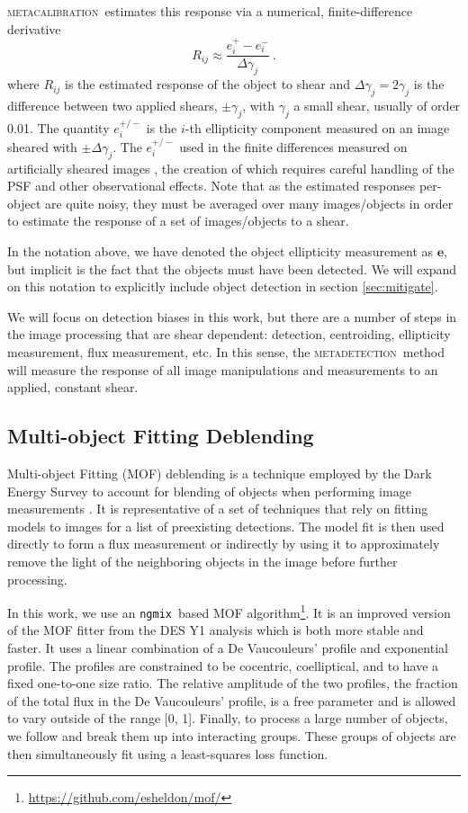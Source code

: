 \documentclass[fleqn,useAMS,usenatbib]{mnras}
\newcommand{\ngmix}{\texttt{ngmix}}
\newcommand{\mcal}{\textsc{metacalibration}}
\newcommand{\mdet}{\textsc{metadetection}}
\begin{document}
\mcal\ estimates this response via a numerical, finite-difference derivative
\begin{displaymath}
R_{ij} \approx \frac{e_i^{+} - e_i^{-}}{\Delta\gamma_j}\ .
\end{displaymath}
where $R_{ij}$ is the estimated response of the object to shear and
$\Delta\gamma_j = 2 \gamma_j$ is the difference between two applied shears,
$\pm \gamma_j$, with $\gamma_j$ a small shear, usually of order 0.01. The
quantity $e_i^{+/-}$ is the $i$-th ellipticity component measured on an image
sheared with $\pm\Delta\gamma_j$.  The $e_i^{+/-}$ used in the finite
differences measured on artificially sheared images \citep{SheldonMcal2017},
the creation of which requires careful handling of the PSF and other
observational effects.  Note that as the estimated responses per-object are
quite noisy, they must be averaged over many images/objects in order to
estimate the response of a set of images/objects to a shear.

In the notation above, we have denoted the object ellipticity measurement as
$\boldsymbol{e}$, but implicit is the fact that the objects must have been
detected.  We will expand on this notation to explicitly include object
detection in section \ref{sec:mitigate}.

We will focus on detection biases in this work, but there are a number of steps
in the image processing that are shear dependent: detection, centroiding,
ellipticity measurement, flux measurement, etc.  In this sense, the \mdet\
method will measure the response of all image manipulations and measurements to
an applied, constant shear.

\subsection{Multi-object Fitting Deblending}

Multi-object Fitting (MOF) deblending is a technique employed by the Dark
Energy Survey to account for blending of objects when performing image
measurements \citep{DESY1cat}. It is representative of a set of techniques that
rely on fitting models to images for a list of preexisting detections. The
model fit is then used directly to form a flux measurement or indirectly by
using it to approximately remove the light of the neighboring objects in the
image before further processing.

In this work, we use an \ngmix\ based MOF
algorithm\footnote{\url{https://github.com/esheldon/mof/}}. It is an improved
version of the MOF fitter from the DES Y1 analysis which is both more stable
and faster. It uses a linear combination of a De Vaucouleurs'
\citep{devauc1948} profile and exponential profile. The profiles are
constrained to be cocentric, coelliptical, and to have a fixed one-to-one size
ratio.  The relative amplitude of the two profiles, the fraction of the total
flux in the De Vaucouleurs' profile, is a free parameter and is allowed to vary
outside of the range [0, 1]. Finally, to process a large number of objects, we
follow \citet{DESY1cat} and break them up into interacting groups.  These
groups of objects are then simultaneously fit using a least-squares loss
function.
\end{document}
